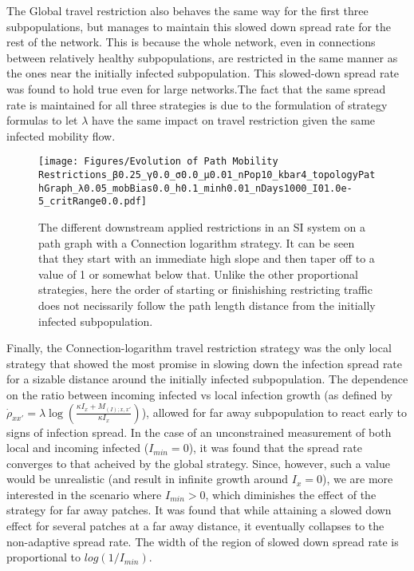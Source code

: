 The Global travel restriction also behaves the same way for the first three subpopulations, but manages to maintain this slowed down spread rate for the rest of the network. This is because the whole network, even in connections between relatively healthy subpopulations, are restricted in the same manner as the ones near the initially infected subpopulation. This slowed-down spread rate was found to hold true even for large networks.The fact that the same spread rate is maintained for all three strategies is due to the formulation of strategy formulas to let $\lambda$ have the same impact on travel restriction given the same infected mobility flow.\\

\begin{figure}
	\centering
    \texttt{[image: Figures/Evolution of Path Mobility Restrictions\_β0.25\_γ0.0\_σ0.0\_μ0.01\_nPop10\_kbar4\_topologyPathGraph\_λ0.05\_mobBias0.0\_h0.1\_minh0.01\_nDays1000\_I01.0e-5\_critRange0.0.pdf]}
    \caption{\small The different downstream applied restrictions in an SI system on a path graph with a Connection logarithm strategy. It can be seen that they start with an immediate high slope and then taper off to a value of 1 or somewhat below that. Unlike the other proportional strategies, here the order of starting or finishishing restricting traffic does not necissarily follow the path length distance from the initially infected subpopulation.}
    \label{fig:log-Restriction}
\end{figure}

Finally, the Connection-logarithm travel restriction strategy was the only local strategy that showed the most promise in slowing down the infection spread rate for a sizable distance around the initially infected subpopulation. The dependence on the ratio between incoming infected vs local infection growth (as defined by $\dot{\rho}_{xx'} = \lambda \log\left(\frac{\kappa I_{x} + M_{(I);x,x'}}{\kappa I_{x}}\right)$), allowed for far away subpopulation to react early to signs of infection spread. In the case of an unconstrained measurement of both local and incoming infected ($I_{min}=0$), it was found that the spread rate converges to that acheived by the global strategy. Since, however, such a value would be unrealistic (and result in infinite growth around $I_x=0$), we are more interested in the scenario where $I_{min}>0$, which diminishes the effect of the strategy for far away patches. It was found that while attaining a slowed down effect for several patches at a far away distance, it eventually collapses to the non-adaptive spread rate. The width of the region of slowed down spread rate is proportional to $log(1/I_{min})$.\\

